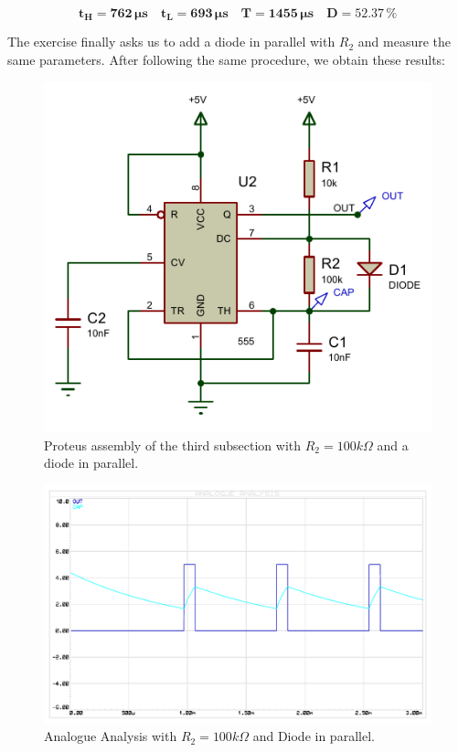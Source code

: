 \vspace{-.4cm}

\begin{equation*}
    \mathbf{t_H} = \mathbf{762 \, \si\micro \text{s}} \quad
    \mathbf{t_L} = \mathbf{693 \, \si\micro \text{s}} \quad
    \mathbf{T} = \mathbf{1455 \, \si\micro \text{s}} \quad
    \mathbf{D} =  \mathbf{52.37 \, \text{\%}}
\end{equation*}
\clearpage


The exercise finally asks us to add a diode in parallel with $R_2$ and measure the same parameters. After following the same procedure, we obtain these results:

\begin{figure}[H]
    \centering
    \includegraphics[scale = 1.1]{Graphics/VHDL/Practice 2/GRAPHICS/555/GRAPHS/PROTEUS/ASSEMBLY/555_ASTABLE_100K_DIODE_ASSEMBLY.PDF}
    \caption{Proteus assembly of the third subsection with $R_2 = 100k \Omega$ and a diode in parallel.}
    \label{fig:555_100K_DIODE}
\end{figure}


\begin{figure}[H]
    \centering
    \includegraphics[scale = 0.8]{Graphics/VHDL/Practice 2/GRAPHICS/555/GRAPHS/PROTEUS/ANALOGUE/555_ASTABLE_ANALOGUE_100K_DIODE.PDF}
    \caption{Analogue Analysis with $R_2 = 100k\Omega$ and Diode in parallel.}
    \label{fig:555_ANALOGUE_100K_DIODE}
\end{figure}

